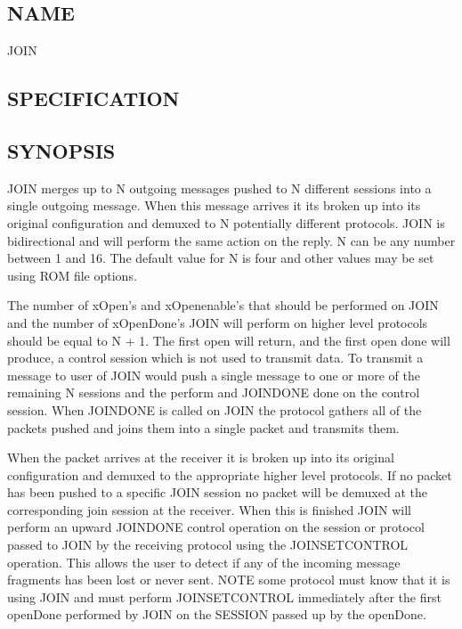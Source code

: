
%
%

\subsection*{NAME}
\label{JOIN}

\noindent JOIN 

\subsection*{SPECIFICATION}

\subsection*{SYNOPSIS}
\noindent

JOIN merges up to N outgoing messages pushed to N different 
sessions into a single outgoing message. When this message 
arrives it its broken up into its original configuration and demuxed 
to N potentially different protocols. JOIN is bidirectional and 
will perform the same action on the reply. N can be any number 
between 1 and 16. The default value for N is four and other 
values may be set using ROM file options. 

The number of xOpen's and xOpenenable's that should be performed 
on JOIN  and the number of xOpenDone's JOIN will perform on 
higher level protocols should be equal to N + 1. The first open 
will return, and the first open done will produce, a control 
session which is not used to transmit data. To transmit a message 
to user of JOIN would push a single message to one or more of 
the remaining N sessions and the perform and JOINDONE done on 
the control session. When JOINDONE is called on JOIN the protocol 
gathers all of the packets pushed and joins them into a single 
packet and transmits them. 

When the packet arrives at the receiver it is broken up into its 
original configuration and demuxed to the appropriate higher 
level protocols.  If no packet has been pushed to a specific JOIN 
session no packet will be demuxed at the corresponding join 
session at the receiver. When this is finished JOIN will perform 
an upward JOINDONE control operation on the session or protocol 
passed to JOIN by the receiving protocol using the JOINSETCONTROL 
operation.  This allows the user to detect if any of the incoming 
message fragments has been lost or never sent. NOTE some protocol 
must know that it is using JOIN and must perform JOINSETCONTROL 
immediately after the first openDone performed by JOIN on the 
SESSION passed up by the openDone.

